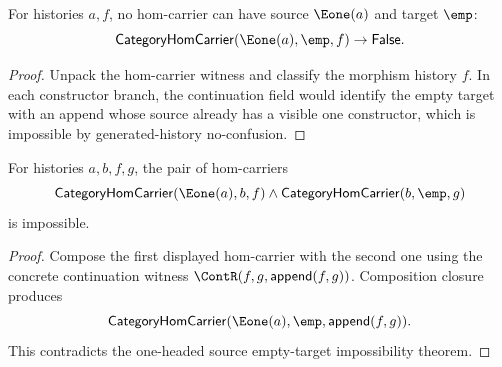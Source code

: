 \begin{theorem}
\label{thm:category-hom-e1-source-empty-target-absurd}
For histories $a,f$, no hom-carrier can have source $\Eone(a)$ and target
$\emp$:
$$
\mathsf{CategoryHomCarrier}(\Eone(a),\emp,f)\to\mathsf{False}.
$$
\end{theorem}
\begin{proof}
Unpack the hom-carrier witness and classify the morphism history \(f\). In
each constructor branch, the continuation field would identify the empty
target with an append whose source already has a visible one constructor,
which is impossible by generated-history no-confusion.
\end{proof}

\begin{theorem}
\label{thm:category-visible-source-empty-target-composite-absurd}
For histories $a,b,f,g$, the pair of hom-carriers
$$
\mathsf{CategoryHomCarrier}(\Eone(a),b,f)
\land
\mathsf{CategoryHomCarrier}(b,\emp,g)
$$
is impossible.
\end{theorem}
\begin{proof}
Compose the first displayed hom-carrier with the second one using the concrete
continuation witness $\ContR(f,g,\mathsf{append}(f,g))$. Composition closure
produces
$$
\mathsf{CategoryHomCarrier}(\Eone(a),\emp,\mathsf{append}(f,g)).
$$
This contradicts the one-headed source empty-target impossibility theorem.
\end{proof}

